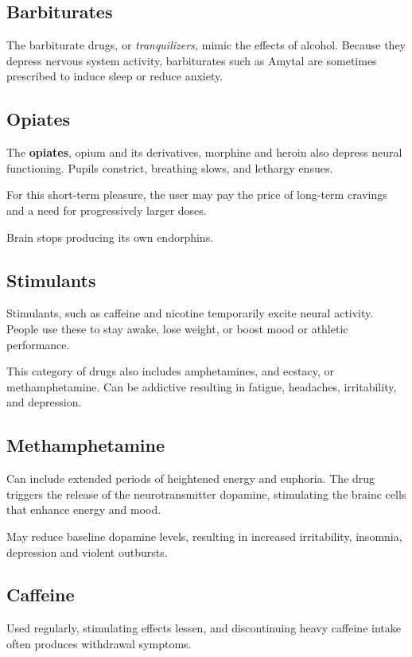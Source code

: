 \documentclass[12pt]{article}
\begin{document}
\subsection*{Barbiturates}
The barbiturate drugs, or \textit{tranquilizers,} mimic the effects of alcohol. Because they depress nervous system activity, barbiturates such as Amytal are sometimes prescribed to induce sleep or reduce anxiety.

\subsection*{Opiates}
The \textbf{opiates}, opium and its derivatives, morphine and heroin also depress neural functioning. Pupils constrict, breathing slows, and lethargy ensues. 

For this short-term pleasure, the user may pay the price of long-term cravings and a need for progressively larger doses. 

Brain stops producing its own endorphins. 

\subsection*{Stimulants}

Stimulants, such as caffeine and nicotine temporarily excite neural activity. People use these to stay awake, lose weight, or boost mood or athletic performance. 

This category of drugs also includes amphetamines, and ecstacy, or methamphetamine. Can be addictive resulting in fatigue, headaches, irritability, and depression.

\subsection*{Methamphetamine}
Can include extended periods of heightened energy and euphoria. The drug triggers the release of the neurotransmitter dopamine, stimulating the brainc cells that enhance energy and mood.

May reduce baseline dopamine levels, resulting in increased irritability, insomnia, depression and violent outbursts. 

\subsection*{Caffeine}

Used regularly, stimulating effects lessen, and discontinuing heavy caffeine intake often produces withdrawal symptoms.
\end{document}
